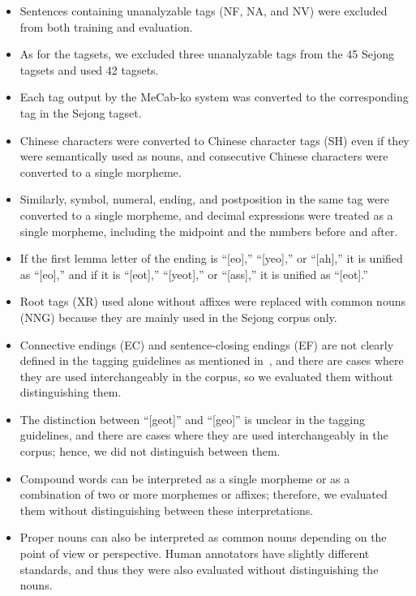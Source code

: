 \documentclass[AMS,STIX2COL]{WileyNJD-v2}
\begin{document}
    \begin{itemize}
        \item Sentences containing unanalyzable tags (NF, NA, and NV) were excluded from both training and evaluation.
        \item As for the tagsets, we excluded three unanalyzable tags from the 45 Sejong tagsets and used 42 tagsets.
        \item Each tag output by the MeCab-ko system was converted to the corresponding tag in the Sejong tagset.
        \item Chinese characters were converted to Chinese character tags (SH) even if they were semantically used as nouns, and consecutive Chinese characters were converted to a single morpheme.
        \item Similarly, symbol, numeral, ending, and postposition in the same tag were converted to a single morpheme, and decimal expressions were treated as a single morpheme, including the midpoint and the numbers before and after.
        \item If the first lemma letter of the ending is ``[eo],'' ``[yeo],'' or ``[ah],'' it is unified as ``[eo],'' and if it is ``[eot],'' ``[yeot],'' or ``[ass],'' it is unified as ``[eot].'' %
        \item Root tags (XR) used alone without affixes were replaced with common nouns (NNG) because they are mainly used in the Sejong corpus only.
        \item Connective endings (EC) and sentence-closing endings (EF) are not clearly defined in the tagging guidelines as mentioned in~\cite{KimIH2010}, and there are cases where they are used interchangeably in the corpus, so we evaluated them without distinguishing them.
        \item The distinction between ``[geot]'' and ``[geo]'' is unclear in the tagging guidelines, and there are cases where they are used interchangeably in the corpus; hence, we did not distinguish between them. %
        \item Compound words can be interpreted as a single morpheme or as a combination of two or more morphemes or affixes; therefore, we evaluated them without distinguishing between these interpretations.
        \item Proper nouns can also be interpreted as common nouns depending on the point of view or perspective. Human annotators have slightly different standards, and thus they were also evaluated without distinguishing the nouns.
    \end{itemize}
\end{document}
